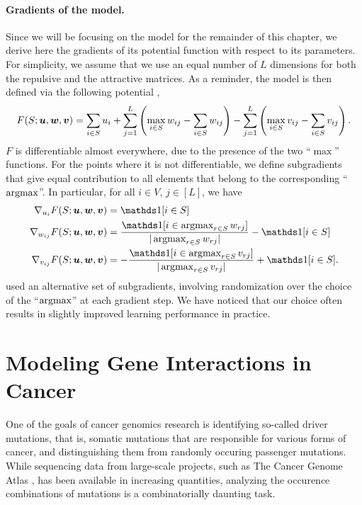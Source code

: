 \paragraph{Gradients of the \fldc{} model.}
Since we will be focusing on the \fldc{} model for the remainder of this chapter, we derive here the gradients of its potential function with respect to its parameters.
For simplicity, we assume that we use an equal number of $L$ dimensions for both the repulsive and the attractive matrices.
As a reminder, the \fldc{} model is then defined via the following potential \citep{djolonga16mixed},
\begin{align*}
F(S; \bm{u}, \bm{w}, \bm{v}) = \sum_{i \in S} u_i + \sum_{j=1}^{L} \left(\max_{i \in S} w_{ij} - \sum_{i \in S} w_{ij}\right) - \sum_{j=1}^{L} \left(\max_{i \in S} v_{ij} - \sum_{i \in S} v_{ij}\right).
\end{align*}
$F$ is differentiable almost everywhere, due to the presence of the two ``$\max$'' functions.
For the points where it is not differentiable, we define subgradients that give equal contribution to all elements that belong to the corresponding ``$\argmax$''.
In particular, for all $i \in V$, $j \in [L]$, we have
\begin{align*}
\nabla_{u_i} F(S; \bu, \bw, \bv) &= \ind[i \in S]\\
\nabla_{w_{ij}} F(S; \bu, \bw, \bv) &= \frac{\ind[i \in \argmax_{r \in S} w_{rj}]}{|\argmax_{r \in S} w_{rj}|} - \ind[i \in S]\\
\nabla_{v_{ij}} F(S; \bu, \bw, \bv) &= -\frac{\ind[i \in \argmax_{r \in S} v_{rj}]}{|\argmax_{r \in S} v_{rj}|} + \ind[i \in S].
\end{align*}
\citet{tschiatschek16} used an alternative set of subgradients, involving randomization over the choice of the ``$\argmax$'' at each gradient step.
We have noticed that our choice often results in slightly improved learning performance in practice.


\section{Modeling Gene Interactions in Cancer}
One of the goals of cancer genomics research is identifying so-called driver mutations, that is, somatic mutations that are responsible for various forms of cancer, and distinguishing them from randomly occuring passenger mutations.
While sequencing data from large-scale projects, such as The Cancer Genome Atlas \citep{tcga}, has been available in increasing quantities, analyzing the occurence combinations of mutations is a combinatorially daunting task.

